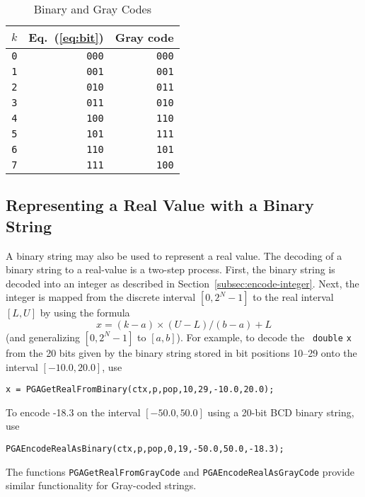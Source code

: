 \documentclass{report}
\begin{document}
\begin{table}
\centering
\caption
{
Binary and Gray Codes\label{tab:gray-code}
}
\begin{tabular}{|r|r|r|} \hline\hline
    $k$ &      Eq.~(\ref{eq:bit}) &    Gray code \\  \hline
{\tt 0} &        {\tt 000} &         {\tt 000} \\
{\tt 1} &        {\tt 001} &         {\tt 001} \\
{\tt 2} &        {\tt 010} &         {\tt 011} \\
{\tt 3} &        {\tt 011} &         {\tt 010} \\
{\tt 4} &        {\tt 100} &         {\tt 110} \\
{\tt 5} &        {\tt 101} &         {\tt 111} \\
{\tt 6} &        {\tt 110} &         {\tt 101} \\
{\tt 7} &        {\tt 111} &         {\tt 100} \\ \hline
\end{tabular}
\end{table}

\subsection{Representing a Real Value with a Binary String}
\label{subsec:encode-real}

A binary string may also be used to represent a real value.  The decoding of a
binary string to a real-value is a two-step process.  First, the binary string
is decoded into an integer as described in
Section~\ref{subsec:encode-integer}.  Next, the integer is mapped from the
discrete interval $[0,2^{N}-1]$ to the real interval $[L,U]$ by using the
formula
\begin{displaymath}
x = (k-a) \times (U-L)/(b-a) + L
\end{displaymath}
(and generalizing $[0,2^{N}-1]$ to $[a,b]$).  For example, to decode the {\tt
double} {\tt x} from the 20 bits given by the binary string stored in bit
positions 10--29 onto the interval $[-10.0,20.0]$, use
\begin{verbatim}
x = PGAGetRealFromBinary(ctx,p,pop,10,29,-10.0,20.0);
\end{verbatim}
To encode -18.3 on the interval $[-50.0,50.0]$
using a 20-bit BCD binary string, use
\begin{verbatim}
PGAEncodeRealAsBinary(ctx,p,pop,0,19,-50.0,50.0,-18.3);
\end{verbatim}
The functions {\tt PGAGetRealFromGrayCode} and 
{\tt PGAEncodeRealAsGrayCode} provide similar functionality for Gray-coded
strings.
\end{document}
